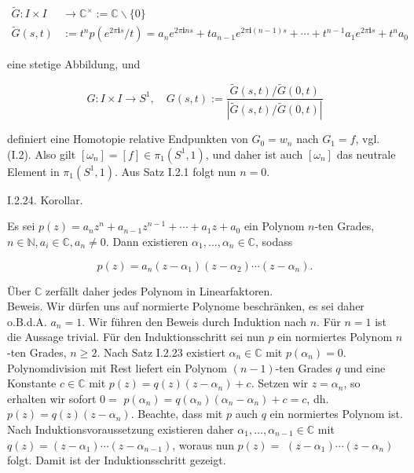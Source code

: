 \documentclass[10pt, letterpaper]{article}
\begin{document}
$$
\begin{aligned}
\tilde{G}: I \times I & \rightarrow \mathbb{C}^{\times}:=\mathbb{C} \backslash\{0\} \\
\tilde{G}(s, t) & :=t^{n} p\left(e^{2 \pi \mathbf{i} s} / t\right)=a_{n} e^{2 \pi \mathbf{i} n s}+t a_{n-1} e^{2 \pi \mathbf{i}(n-1) s}+\cdots+t^{n-1} a_{1} e^{2 \pi \mathbf{i} s}+t^{n} a_{0}
\end{aligned}
$$

eine stetige Abbildung, und

$$
G: I \times I \rightarrow S^{1}, \quad G(s, t):=\frac{\tilde{G}(s, t) / \tilde{G}(0, t)}{|\tilde{G}(s, t) / \tilde{G}(0, t)|}
$$

definiert eine Homotopie relative Endpunkten von $G_{0}=w_{n}$ nach $G_{1}=f$, vgl. (I.2). Also gilt $\left[\omega_{n}\right]=[f] \in \pi_{1}\left(S^{1}, 1\right)$, und daher ist auch $\left[\omega_{n}\right]$ das neutrale Element in $\pi_{1}\left(S^{1}, 1\right)$. Aus Satz I.2.1 folgt nun $n=0$.


I.2.24. Korollar. 


Es sei $p(z)=a_{n} z^{n}+a_{n-1} z^{n-1}+\cdots+a_{1} z+a_{0}$ ein Polynom $n$-ten Grades, $n \in \mathbb{N}, a_{i} \in \mathbb{C}, a_{n} \neq 0$. Dann existieren $\alpha_{1}, \ldots, \alpha_{n} \in \mathbb{C}$, sodass

$$
p(z)=a_{n}\left(z-\alpha_{1}\right)\left(z-\alpha_{2}\right) \cdots\left(z-\alpha_{n}\right) .
$$

Über $\mathbb{C}$ zerfällt daher jedes Polynom in Linearfaktoren.\\
Beweis. Wir dürfen uns auf normierte Polynome beschränken, es sei daher o.B.d.A. $a_{n}=1$. Wir führen den Beweis durch Induktion nach $n$. Für $n=1$ ist die Aussage trivial. Für den Induktionsschritt sei nun $p$ ein normiertes Polynom $n$-ten Grades, $n \geq 2$. Nach Satz I.2.23 existiert $\alpha_{n} \in \mathbb{C}$ mit $p\left(\alpha_{n}\right)=0$. Polynomdivision mit Rest liefert ein Polynom $(n-1)$-ten Grades $q$ und eine Konstante $c \in \mathbb{C}$ mit $p(z)=q(z)\left(z-\alpha_{n}\right)+c$. Setzen wir $z=\alpha_{n}$, so erhalten wir sofort $0=$ $p\left(\alpha_{n}\right)=q\left(\alpha_{n}\right)\left(\alpha_{n}-\alpha_{n}\right)+c=c$, dh. $p(z)=q(z)\left(z-\alpha_{n}\right)$. Beachte, dass mit $p$ auch $q$ ein normiertes Polynom ist. Nach Induktionsvoraussetzung existieren daher $\alpha_{1}, \ldots, \alpha_{n-1} \in \mathbb{C}$ mit $q(z)=\left(z-\alpha_{1}\right) \cdots\left(z-\alpha_{n-1}\right)$, woraus nun $p(z)=$ $\left(z-\alpha_{1}\right) \cdots\left(z-\alpha_{n}\right)$ folgt. Damit ist der Induktionsschritt gezeigt.
\end{document}
